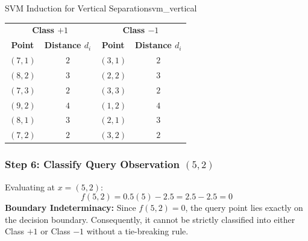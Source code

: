 \begin{example}{SVM Induction for Vertical Separation}{svm_vertical}
\begin{center}\small
\begin{tabular}{cc|cc}
\toprule
\multicolumn{2}{c|}{\textbf{Class $+1$}} & \multicolumn{2}{c}{\textbf{Class $-1$}} \\
\textbf{Point} & \textbf{Distance $d_i$} & \textbf{Point} & \textbf{Distance $d_i$} \\
\midrule
$(7, 1)$ & $2$ & $(3, 1)$ & $2$ \\
$(8, 2)$ & $3$ & $(2, 2)$ & $3$ \\
$(7, 3)$ & $2$ & $(3, 3)$ & $2$ \\
$(9, 2)$ & $4$ & $(1, 2)$ & $4$ \\
$(8, 1)$ & $3$ & $(2, 1)$ & $3$ \\
$(7, 2)$ & $2$ & $(3, 2)$ & $2$ \\
\bottomrule
\end{tabular}
\end{center}

\subsubsection{Step 6: Classify Query Observation \texorpdfstring{$(5, 2)$}{(5, 2)}}
Evaluating at $x = (5, 2)$:
\begin{equation}
f(5, 2) = 0.5(5) - 2.5 = 2.5 - 2.5 = 0
\end{equation}
\textbf{Boundary Indeterminacy:} Since $f(5, 2) = 0$, the query point lies exactly on the decision boundary. Consequently, it cannot be strictly classified into either Class $+1$ or Class $-1$ without a tie-breaking rule.

\begin{center}
\end{center}
\end{example}
